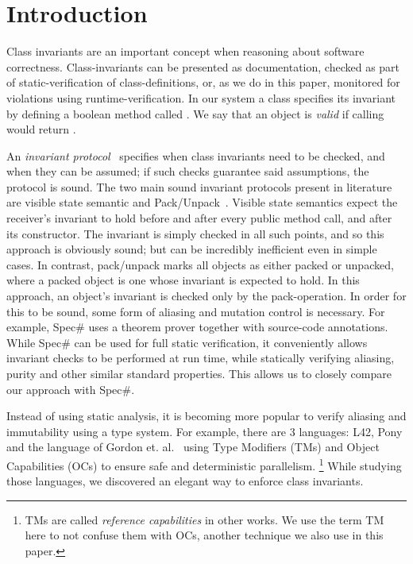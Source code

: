 \section{Introduction}
{}
Class invariants are an important concept when reasoning about software correctness.
Class-invariants can be presented as documentation, checked as part of static-verification of class-definitions, or, as we do in this paper, monitored for violations using runtime-verification.
In our system a class specifies its invariant by defining a boolean method called \Q@invariant@. We say that an object is \emph{valid} if calling \Q@invariant@ would return \Q@true@.

An \emph{invariant protocol}~\cite{?} specifies when class invariants need to be checked, and when they can be assumed; if such checks guarantee said assumptions, the protocol is sound.
The two main sound invariant protocols present in literature are visible state semantic \cite{??} and Pack/Unpack~\cite{?}. Visible state semantics expect the receiver's invariant to hold before and after every public method call, and after its constructor. The invariant is simply checked in all such points, and so this approach is obviously sound; but can be incredibly inefficient even in simple cases.
In contrast, pack/unpack marks all objects as either packed or unpacked, where a packed object is one whose invariant is expected to hold.
In this approach, an object's invariant is checked only by the pack-operation.
In order for this to be sound, some form of aliasing and mutation control is necessary. For example, Spec\# uses a theorem prover together with source-code annotations.
While Spec\# can be used for full static verification, it conveniently allows invariant checks to be performed
at run time, while statically verifying aliasing, purity and other similar standard properties.
This allows us to closely compare our approach with Spec\#.

Instead of using static analysis, 
it is becoming more popular to verify aliasing and immutability using a type system.
For example, there are 3 languages: L42, Pony and the language of Gordon et. al.~\cite{?}
using Type Modifiers (TMs) and Object Capabilities (OCs) to ensure safe and deterministic parallelism.%
\footnote{TMs are called \emph{reference capabilities} in other works. We use the term TM here
to not confuse them with OCs, another technique we also use in this paper.}
While studying those languages, we discovered an elegant way to enforce class invariants.

